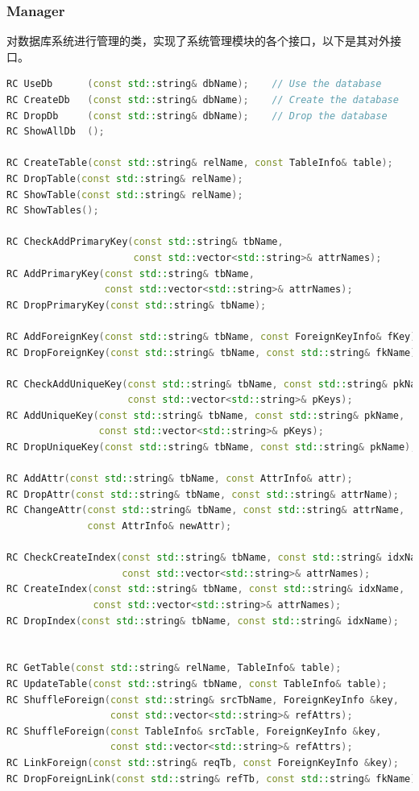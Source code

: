 \documentclass{article}
\begin{document}
\subsubsection{Manager}
对数据库系统进行管理的类，实现了系统管理模块的各个接口，以下是其对外接口。
\begin{lstlisting}[language=C++]
RC UseDb      (const std::string& dbName);    // Use the database
RC CreateDb   (const std::string& dbName);    // Create the database
RC DropDb     (const std::string& dbName);    // Drop the database
RC ShowAllDb  ();

RC CreateTable(const std::string& relName, const TableInfo& table);
RC DropTable(const std::string& relName);
RC ShowTable(const std::string& relName);
RC ShowTables();

RC CheckAddPrimaryKey(const std::string& tbName,
                      const std::vector<std::string>& attrNames);
RC AddPrimaryKey(const std::string& tbName,
                 const std::vector<std::string>& attrNames);
RC DropPrimaryKey(const std::string& tbName);

RC AddForeignKey(const std::string& tbName, const ForeignKeyInfo& fKey);
RC DropForeignKey(const std::string& tbName, const std::string& fkName);

RC CheckAddUniqueKey(const std::string& tbName, const std::string& pkName,
                     const std::vector<std::string>& pKeys);
RC AddUniqueKey(const std::string& tbName, const std::string& pkName,
                const std::vector<std::string>& pKeys);
RC DropUniqueKey(const std::string& tbName, const std::string& pkName);

RC AddAttr(const std::string& tbName, const AttrInfo& attr);
RC DropAttr(const std::string& tbName, const std::string& attrName);
RC ChangeAttr(const std::string& tbName, const std::string& attrName,
              const AttrInfo& newAttr);

RC CheckCreateIndex(const std::string& tbName, const std::string& idxName,
                    const std::vector<std::string>& attrNames);
RC CreateIndex(const std::string& tbName, const std::string& idxName,
               const std::vector<std::string>& attrNames);
RC DropIndex(const std::string& tbName, const std::string& idxName);


RC GetTable(const std::string& relName, TableInfo& table);
RC UpdateTable(const std::string& tbName, const TableInfo& table);
RC ShuffleForeign(const std::string& srcTbName, ForeignKeyInfo &key,
                  const std::vector<std::string>& refAttrs);
RC ShuffleForeign(const TableInfo& srcTable, ForeignKeyInfo &key,
                  const std::vector<std::string>& refAttrs);
RC LinkForeign(const std::string& reqTb, const ForeignKeyInfo &key);
RC DropForeignLink(const std::string& refTb, const std::string& fkName);
\end{lstlisting}
\end{document}
